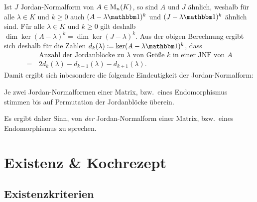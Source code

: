Ist $J$ Jordan-Normalform von $A \in \operatorname{M}_{n}(K)$, so sind $A$ und $J$ ähnlich, weshalb für alle $\lambda \in K$ und $k \geq 0$ auch $(A - \lambda \Id)^k$ und $(J - \lambda \Id)^k$ ähnlich sind.
Für alle $\lambda \in K$ und $k \geq 0$ gilt deshalb $\dim \ker (A - \lambda)^k = \dim \ker (J - \lambda)^k$.
Aus der obigen Berechnung ergibt sich deshalb für die Zahlen $d_k(\lambda) \coloneqq \ker (A - \lambda \Id)^k$, dass
\begin{align*}
   &\, \text{Anzahl der Jordanblöcke zu $\lambda$ von Größe $k$ in einer JNF von $A$} \\
  =&\, 2 d_k(\lambda) - d_{k-1}(\lambda) - d_{k+1}(\lambda).
\end{align*}
Damit ergibt sich inbesondere die folgende Eindeutigkeit der Jordan-Normalform:

\begin{proposition}
  Je zwei Jordan-Normalformen einer Matrix, bzw.\ eines Endomorphismus stimmen bis auf Permutation der Jordanblöcke überein.
\end{proposition}

Es ergibt daher Sinn, von \emph{der} Jordan-Normalform einer Matrix, bzw.\ eines Endomorphismus zu sprechen.


\pagebreak



\section{Existenz \& Kochrezept}



\subsection*{Existenzkriterien}

